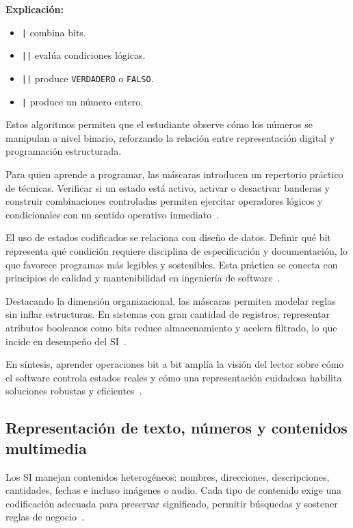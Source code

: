 \documentclass[12pt,twoside]{book}
\begin{document}
						\noindent
						\textbf{Explicación:}
						
						\begin{itemize}[label=-]
							\item \texttt{|} combina bits.
							\item \texttt{||} evalúa condiciones lógicas.
							\item \texttt{||} produce \texttt{VERDADERO} o \texttt{FALSO}.
							\item \texttt{|} produce un número entero.
						\end{itemize}
						
						Estos algoritmos permiten que el estudiante observe cómo los números se manipulan a nivel binario, reforzando la relación entre representación digital y programación estructurada.
						
						\noindent
						Para quien aprende a programar, las máscaras introducen un repertorio práctico de técnicas. Verificar si un estado está activo, activar o desactivar banderas y construir combinaciones controladas permiten ejercitar operadores lógicos y condicionales con un sentido operativo inmediato~\cite{Gaddis2022Starting,Hanly2015Problem,Sebesta2018Concepts}.
						
						El uso de estados codificados se relaciona con diseño de datos. Definir qué bit representa qué condición requiere disciplina de especificación y documentación, lo que favorece programas más legibles y sostenibles. Esta práctica se conecta con principios de calidad y mantenibilidad en ingeniería de software~\cite{Sommerville2015Software,Ghezzi2003Fundamentals,Pressman2019Software}.
						
						Destacando la dimensión organizacional, las máscaras permiten modelar reglas sin inflar estructuras. En sistemas con gran cantidad de registros, representar atributos booleanos como bits reduce almacenamiento y acelera filtrado, lo que incide en desempeño del SI~\cite{Laudon2020Management,Sedgewick2011Algorithms,Tanenbaum2021Structured}.
						
						En síntesis, aprender operaciones bit a bit amplía la visión del lector sobre cómo el software controla estados reales y cómo una representación cuidadosa habilita soluciones robustas y eficientes~\cite{Wirth1976Algorithms,Gaddis2022Starting,Hanly2015Problem}.
						
				\subsection{Representación de texto, números y contenidos multimedia}
					\noindent
					Los SI manejan contenidos heterogéneos: nombres, direcciones, descripciones, cantidades, fechas e incluso imágenes o audio. Cada tipo de contenido exige una codificación adecuada para preservar significado, permitir búsquedas y sostener reglas de negocio~\cite{Laudon2020Management,Date2019Database,Elmasri2016Database}.
					
\end{document}
